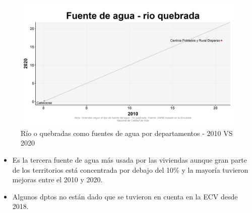     \begin{figure}[H]
        \caption{Río o quebradas como fuentes de agua por departamentos - 2010 VS 2020 \label{map_result_2} }
        \begin{center}
        \includegraphics[width=\textwidth,keepaspectratio]{img/var_142_scatter_time.png}
        \end{center}
    \end{figure}
            \begin{itemize}
                    \item Es la tercera fuente de agua más usada por las viviendas aunque gran parte de los territorios está concentrada por debajo del 10\% y la mayoría tuvieron mejoras entre el 2010 y 2020.
                    \item Algunos dptos no están dado que se tuvieron en cuenta en la ECV desde 2018.
                    \end{itemize}

